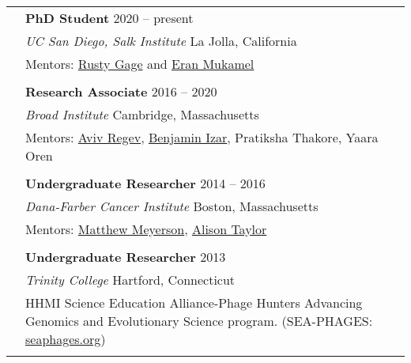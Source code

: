 \documentclass[letterpaper, 11pt]{article}
\begin{document}
\begin{longtable}{p{1.6in}p{4.9in}}

{\color{OliveGreen}{Research experience}}
& \textbf{PhD Student} \hfill 2020 -- present   \\
& \textit{UC San Diego, Salk Institute} \hfill La Jolla, California \\
& Mentors: \href{https://www.salk.edu/scientist/rusty-gage/}{Rusty Gage} and \href{https://cogsci.ucsd.edu/people/faculty/eran-mukamel.html}{Eran Mukamel} \\
& \\

& \textbf{Research Associate} \hfill 2016 -- 2020  \\
& \textit{Broad Institute} \hfill Cambridge, Massachusetts \\
& Mentors: \href{https://www.roche.com/about/leadership/aviv-regev}{Aviv Regev}, 
\href{https://www.cancer.columbia.edu/profile/benjamin-izar-md}{Benjamin Izar}, 
Pratiksha Thakore, 
Yaara Oren \\
& \\

& \textbf{Undergraduate Researcher} \hfill 2014 -- 2016\\
& \textit{Dana-Farber Cancer Institute}  \hfill Boston, Massachusetts\\
& Mentors: \href{https://meyersonlab.dana-farber.org/matthew-meyerson.html}{Matthew Meyerson}, 
\href{https://www.cancer.columbia.edu/profile/alison-taylor-phd}{Alison Taylor}  \\
& \\

& \textbf{Undergraduate Researcher} \hfill 2013 \\
& \textit{Trinity College} \hfill Hartford, Connecticut \\
& HHMI Science Education Alliance-Phage Hunters Advancing Genomics and Evolutionary Science program. 
(SEA-PHAGES: \href{https://seaphages.org/}{seaphages.org}) \\
& \\


\end{longtable} %
\end{document}
